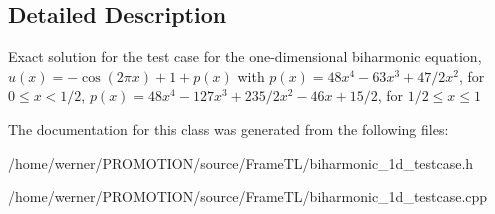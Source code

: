 \subsection{Detailed Description}
Exact solution for the test case for the one-dimensional biharmonic equation, $u(x) = -\cos(2\pi x)+1 + p(x)$ with $p(x) = 48x^4-63x^3+47/2x^2$, for $0 \leq x < 1/2$, $p(x) = 48x^4-127x^3+235/2x^2-46x+15/2$, for $1/2 \leq x \leq 1$ 

The documentation for this class was generated from the following files:\begin{CompactItemize}
\item 
/home/werner/PROMOTION/source/FrameTL/biharmonic\_\-1d\_\-testcase.h\item 
/home/werner/PROMOTION/source/FrameTL/biharmonic\_\-1d\_\-testcase.cpp\end{CompactItemize}
